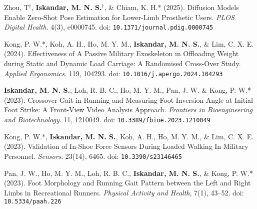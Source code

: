 \documentclass[../main.tex]{subfiles}
\begin{document}
        \begin{etaremune}
            \item\label{article: diffusion_openpose}{Zhou, T$^\dagger$, \textbf{Iskandar, M. N. S.}$^\dagger$, \& Chiam, K. H.* (2025). Diffusion Models Enable Zero-Shot Pose Estimation for Lower-Limb Prosthetic Users. \textit{PLOS Digital Health}. 4(3), e0000745. doi: \nolinkurl{10.1371/journal.pdig.0000745} \href{https://doi.org/10.1371/journal.pdig.0000745}{\faFilePdfO}}

            \item\label{article: spm exoskeleton}{Kong, P. W.*, Koh, A. H., Ho, M. Y. M., \textbf{Iskandar, M. N. S.}, \& Lim, C. X. E. (2024). Effectiveness of A Passive Military Exoskeleton in Offloading Weight during Static and Dynamic Load Carriage: A Randomised Cross-Over Study. \textit{Applied Ergonomics}. 119, 104293. doi: \nolinkurl{10.1016/j.apergo.2024.104293} \href{https://doi.org/10.1016/j.apergo.2024.104293}{\faFilePdfO} \href{https://github.com/Shahril-Iskandar/publication-exoskeleton}{\faGithub}}

            \item\label{article: frontiers crossover gait} {\textbf{Iskandar, M. N. S.}, Loh, R. B. C., Ho, M. Y. M., Pan, J. W. \& Kong, P. W.* (2023). Crossover Gait in Running and Measuring Foot Inversion Angle at Initial Foot Strike: A Front-View Video Analysis Approach. \textit{Frontiers in Bioengineering and Biotechnology}. 11, 1210049. doi: \nolinkurl{10.3389/fbioe.2023.1210049} \href{https://doi.org/10.3389/fbioe.2023.1210049}{\faFilePdfO} \href{https://github.com/Shahril-Iskandar/publication-crossover-gait}{\faGithub}} %
            
            \item\label{article: sensors validation exoskeletal} {Kong, P. W.*, \textbf{Iskandar, M. N. S.}, Koh, A. H., Ho, M. Y. M., \& Lim, C. X. E. (2023). Validation of In-Shoe Force Sensors During Loaded Walking In Military Personnel. \textit{Sensors}. 23(14), 6465. doi: \nolinkurl{10.3390/s23146465} \href{https://doi.org/10.3390/s23146465}{\faFilePdfO} \href{https://github.com/Shahril-Iskandar/publication-loadsol-validation-military}{\faGithub}} %
            
            \item\label{article: paah foot morphology} {Pan, J. W., Ho, M. Y. M., Loh, R. B. C., \textbf{Iskandar, M. N. S.}, \& Kong, P. W.* (2023). Foot Morphology and Running Gait Pattern between the Left and Right Limbs in Recreational Runners. \textit{Physical Activity and Health}, 7(1), 43–52. doi: \nolinkurl{10.5334/paah.226} \href{https://doi.org/10.5334/paah.226}{\faFilePdfO}} %
        \end{etaremune}
                
\end{document}
